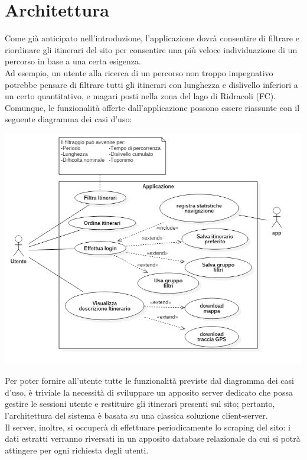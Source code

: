 \documentclass[11pt]{report}
\begin{document}
\section{Architettura}
Come già anticipato nell'introduzione, l'applicazione dovrà consentire di filtrare e riordinare gli itinerari del sito per consentire una più veloce individuazione di un percorso in base a una certa esigenza.
\\Ad esempio, un utente alla ricerca di un percorso non troppo impegnativo potrebbe pensare di filtrare tutti gli itinerari con lunghezza e dislivello inferiori a un certo quantitativo, e magari posti nella zona del lago di Ridracoli (FC).
\\Comunque, le funzionalità offerte dall'applicazione possono essere riassunte con il seguente diagramma dei casi d'uso: 
\\
\begin{center}
\includegraphics[scale=0.5]{use_case_diagram}
\end{center}
Per poter fornire all'utente tutte le funzionalità previste dal diagramma dei casi d'uso, è triviale la necessità di sviluppare un apposito server dedicato che possa gestire le sessioni utente e restituire gli itinerari presenti sul sito; pertanto, l'architettura del sistema è basata su una classica soluzione client-server.
\\Il server, inoltre, si occuperà di effettuare periodicamente lo scraping del sito: i dati estratti verranno riversati in un apposito database relazionale da cui si potrà attingere per ogni richiesta degli utenti.\\
\end{document}
